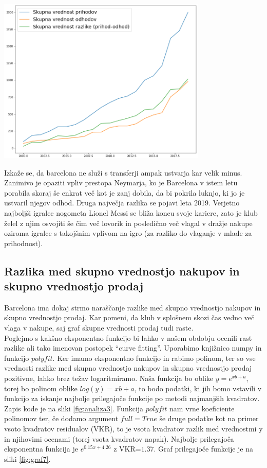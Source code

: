 \documentclass[a4paper, 12pt]{article}
\begin{document}
\begin{center}
\includegraphics[width=0.75\textwidth]{graf5}
\label{fig:graf5}
\end{center}

Izkaže se, da barcelona ne služi s transferji ampak ustvarja kar velik minus.
Zanimivo je opaziti vpliv prestopa Neymarja, ko je Barcelona v istem letu porabila skoraj še enkrat več kot je zanj dobila, da bi pokrila luknjo, ki jo je ustvaril njegov odhod.
Druga največja razlika se pojavi leta 2019. Verjetno najboljši igralec nogometa Lionel Messi se bliža koncu svoje kariere, zato je klub želel z njim osvojiti še čim več lovorik in posledično več vlagal v dražje nakupe oziroma igralce s takojšnim vplivom na igro (za razliko do vlaganje v mlade za prihodnost). 

\subsection{Razlika med skupno vrednostjo nakupov in skupno vrednostjo prodaj}
Barcelona ima dokaj strmo naraščanje razlike med skupno vrednostjo nakupov in skupno vrednostjo prodaj. Kar pomeni, da klub v splošnem skozi čas vedno več vlaga v nakupe, saj graf skupne vrednosti prodaj tudi raste. \\

Poglejmo s kakšno eksponentno funkcijo bi lahko v našem obdobju ocenili rast razlike ali tako imenovan postopek ``curve fitting''. Uporabimo knjižnico numpy in funkcijo $polyfit$. 
Ker imamo eksponentno funkcijo in rabimo polinom, ter so vse vrednosti razlike med skupno vrednostjo nakupov in skupno vrednostjo prodaj pozitivne, lahko brez težav logaritmiramo.
Naša funkcija bo oblike $y=e^{xb+a}$, torej bo polinom oblike $log(y)=xb+a$, to bodo podatki, ki jih bomo vstavili v funkcijo za iskanje najbolje prilegajoče funkcije po metodi najmanjših kvadratov. Zapis kode je na sliki \ref{fig:analiza3}. Funkcija $polyfit$ nam vrne koeficiente polinomov ter, če dodamo argument $full=True$ še druge podatke kot na primer vsoto kvadratov residualov (VKR), to je vsota kvadratov razlik med vrednostmi y in njihovimi ocenami (torej vsota kvadratov napak). 
Najbolje prilegajoča eksponentna funkcija je $e^{0.15x+4.26}$ z VKR=$1.37$. Graf prilegajoče funkcije je na sliki \ref{fig:graf7}.
\end{document}
